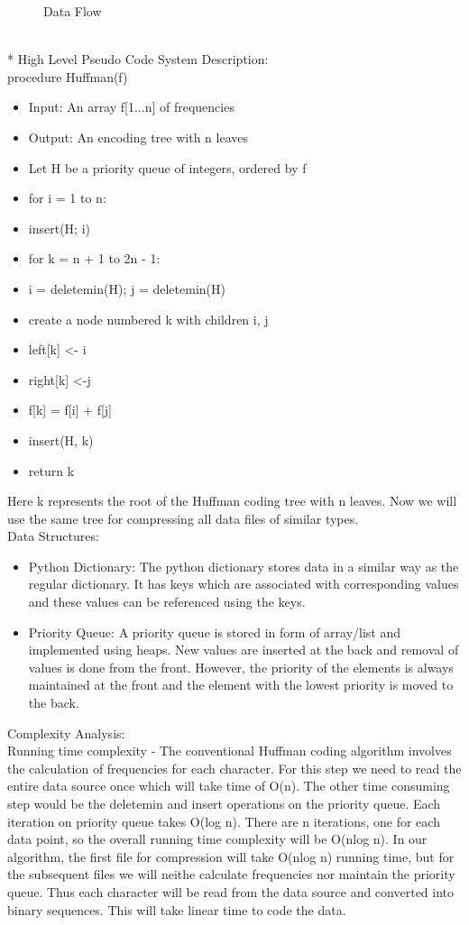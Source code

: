 {\begin{figure}[!h]
    \caption{Data Flow}
\end{figure}
\\*
High Level Pseudo Code System Description:
\\
procedure Huffman(f)
\begin{itemize}
  \item[] Input: An array f[1...n] of frequencies
  \item[] Output: An encoding tree with n leaves
  \item[] Let H be a priority queue of integers, ordered by f
  \item[] for i = 1 to n: 
  \item[]\makebox[0.5cm][l]{ } insert(H; i)
  \item[]for k = n + 1 to 2n - 1:
  \item[]\makebox[0.5cm][l]{ } i = deletemin(H); j = deletemin(H) 
  \item[]\makebox[0.5cm][l]{ } create a node numbered k with children i, j
  \item[]\makebox[0.5cm][l]{ } left[k] <- i
  \item[]\makebox[0.5cm][l]{ } right[k] <-j
  \item[]\makebox[0.5cm][l]{ } f[k] = f[i] + f[j]
  \item[]\makebox[0.5cm][l]{ } insert(H, k)
  \item[] return k
\end{itemize}
Here k represents the root of the Huffman coding tree with n leaves. Now we will use the same tree for compressing all data files of similar types.
\\
Data Structures:
\begin{itemize}
\item {Python Dictionary: The python dictionary stores data in a similar way as the regular dictionary. It has keys which are associated with corresponding values and these values can be referenced using the keys.}
\item {Priority Queue: A priority queue is stored in form of array/list and implemented using heaps. New values are inserted at the back and removal of values is done from the front. However, the priority of the elements is always maintained at the front and the element with the lowest priority is moved to the back.}
\end{itemize}
Complexity Analysis:
\\
Running time complexity - The conventional Huffman coding algorithm involves the calculation of frequencies for each character. For this step we need to read the entire data source once which will take time of O(n). The other time consuming step would be the deletemin and insert operations on the priority queue. Each iteration on priority queue takes O(log n). There are n iterations, one for each data point, so the overall running time complexity will be O(nlog n). In our algorithm, the first file for compression will take O(nlog n) running time, but for the subsequent files we will neithe calculate frequencies nor maintain the priority queue. Thus each character will be read from the data source and converted into binary sequences. This will take linear time to code the data.
}
